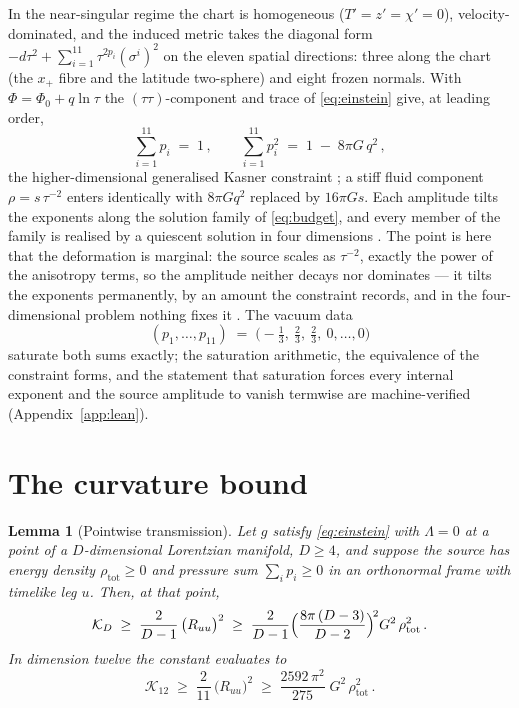 \documentclass[11pt]{article}
\numberwithin{equation}{section}
\theoremstyle{plain}
\newtheorem{lemma}[theorem]{Lemma}
\theoremstyle{definition}
\theoremstyle{remark}
\newcommand{\Kr}{\mathcal{K}}
\newcommand{\Geff}{G}
\begin{document}
In the near-singular regime the chart is homogeneous
($T' = z' = \chi' = 0$), velocity-dominated, and the induced metric
takes the diagonal form
$-d\tau^{2} + \sum_{i=1}^{11}\tau^{2p_{i}}(\sigma^{i})^{2}$ on the
eleven spatial directions: three along the chart (the $x_{+}$ fibre
and the latitude two-sphere) and eight frozen normals. With
$\Phi = \Phi_{0} + q\ln\tau$ the $(\tau\tau)$-component and trace of
\eqref{eq:einstein} give, at leading order,
\begin{equation}\label{eq:budget}
\sum_{i=1}^{11} p_{i} \;=\; 1\,, \qquad
\sum_{i=1}^{11} p_{i}^{2} \;=\; 1 \;-\; 8\pi\Geff\, q^{2}\,,
\end{equation}
the higher-dimensional generalised Kasner constraint
\cite{DemaretHenneauxSpindel1985}; a stiff fluid component
$\rho = s\,\tau^{-2}$ enters identically with $8\pi\Geff q^{2}$
replaced by $16\pi\Geff s$. Each amplitude tilts the exponents along
the solution family of \eqref{eq:budget}, and every member of the
family is realised by a quiescent solution in four dimensions
\cite{AnderssonRendall2001}. The point is here that the deformation is
marginal: the source scales as $\tau^{-2}$, exactly the power of the
anisotropy terms, so the amplitude neither decays nor dominates ---
it tilts the exponents permanently, by an amount the constraint
records, and in the four-dimensional problem nothing fixes it
\cite{AnderssonRendall2001}. The vacuum data
\begin{equation}\label{eq:winding-data}
(p_{1}, \dots, p_{11}) \;=\;
\bigl(-\tfrac13,\ \tfrac23,\ \tfrac23,\ 0, \dots, 0\bigr)
\end{equation}
saturate both sums exactly; the saturation arithmetic, the equivalence
of the constraint forms, and the statement that saturation forces
every internal exponent and the source amplitude to vanish termwise
are machine-verified (Appendix~\ref{app:lean}).

\section{The curvature bound}\label{sec:bound}

\begin{lemma}[Pointwise transmission]\label{lem:transmission}
Let $g$ satisfy \eqref{eq:einstein} with $\Lambda = 0$ at a point of a
$D$-dimensional Lorentzian manifold, $D \geq 4$, and suppose the
source has energy density $\rho_{\mathrm{tot}} \geq 0$ and pressure
sum $\sum_{i} p_{i} \geq 0$ in an orthonormal frame with timelike leg
$u$. Then, at that point,
\begin{equation}\label{eq:bound-genD}
\Kr_{D} \;\geq\; \frac{2}{D-1}\,\bigl(R_{uu}\bigr)^{2}
\;\geq\; \frac{2}{D-1}\Bigl(\frac{8\pi\,(D-3)}{D-2}\Bigr)^{\!2}
\Geff^{2}\,\rho_{\mathrm{tot}}^{2}\,.
\end{equation}
In dimension twelve the constant evaluates to
\begin{equation}\label{eq:bound}
\Kr_{12} \;\geq\; \frac{2}{11}\,\bigl(R_{uu}\bigr)^{2}
\;\geq\; \frac{2592\,\pi^{2}}{275}\;\Geff^{2}\,
\rho_{\mathrm{tot}}^{2}\,.
\end{equation}
\end{lemma}
\end{document}
